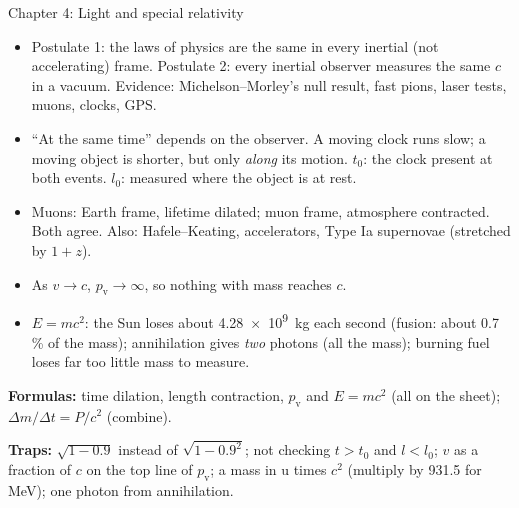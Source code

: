 \begin{summarybox}[fontupper=\small]{Chapter 4: Light and special relativity}
\begin{itemize}[itemsep=0pt, topsep=2pt]
  \item Postulate 1: the laws of physics are the same in every inertial (not accelerating)
        frame. Postulate 2: every inertial observer measures the same $c$ in a vacuum.
        Evidence: Michelson--Morley's null result, fast pions, laser tests, muons, clocks, GPS.
  \item ``At the same time'' depends on the observer. A moving clock runs slow; a moving
        object is shorter, but only \emph{along} its motion. $t_0$: the clock present at both
        events. $l_0$: measured where the object is at rest.
  \item Muons: Earth frame, lifetime dilated; muon frame, atmosphere contracted. Both agree.
        Also: Hafele--Keating, accelerators, Type Ia supernovae (stretched by $1 + z$).
  \item As $v \to c$, $p_\mathrm{v} \to \infty$, so nothing with mass reaches $c$.
  \item $E = mc^2$: the Sun loses about \qty{4.28e9}{kg} each second (fusion: about 0.7\,\% of
        the mass); annihilation gives \emph{two} photons (all the mass); burning fuel loses
        far too little mass to measure.
\end{itemize}
\textbf{Formulas:} time dilation, length contraction, $p_\mathrm{v}$ and $E = mc^2$ (all on
the sheet); $\Delta m/\Delta t = P/c^2$ (combine).
\par\textbf{Traps:} \textcolor{hscmistake}{\faTimes} $\sqrt{1 - 0.9}$ instead of
$\sqrt{1 - 0.9^2}$; \textcolor{hscmistake}{\faTimes} not checking $t > t_0$ and $l < l_0$;
\textcolor{hscmistake}{\faTimes} $v$ as a fraction of $c$ on the top line of $p_\mathrm{v}$;
\textcolor{hscmistake}{\faTimes} a mass in \si{\amu} times $c^2$ (multiply by 931.5 for
\si{\mega\eV}); \textcolor{hscmistake}{\faTimes} one photon from annihilation.
\end{summarybox}
